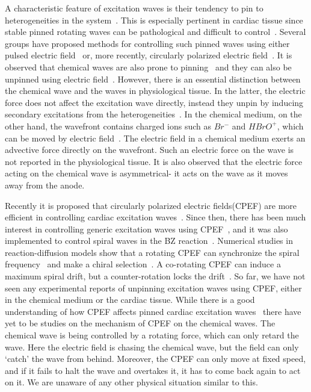 \documentclass[%
 reprint,
 amsmath,amssymb,
 aps,
prb,
]{revtex4-2}
\begin{document}
A characteristic feature of excitation waves is their
tendency to pin to heterogeneities in the
system~\cite{sutthiopad2015propagation, lim2006spiral,Zemlin2012, Shajahan:07}. This is especially
pertinent in cardiac tissue since stable pinned rotating waves can be
pathological and difficult to control~\cite{Gray2011, Bittihn2010}. Several
groups have proposed methods for controlling such pinned waves using either
pulsed electric field~\cite{Luther2011} or, more recently, circularly
polarized electric field~\cite{Feng2014, pan2016removal,feng2022removal}. It is
observed that chemical waves are also prone to pinning~\cite{???} and they can
also be unpinned using electric field~\cite{Amrutha,???}. However, there is an
essential distinction between the chemical wave and the waves in physiological
tissue. In the latter, the electric force does not affect the excitation wave
directly, instead they unpin by inducing secondary excitations from the
heterogeneities~\cite{pumir2007wave}. In the chemical medium, on the other hand,
the wavefront
contains charged ions such as $Br^-$ and $HBrO^+$, which can be moved by
electric field~\cite{Amrutha,jimenez2013electric,???}. The electric field in a
chemical medium exerts an advective force directly on the wavefront. Such an electric force on the wave is not reported in the physiological tissue. It is
also observed that the electric force acting on the chemical wave is
asymmetrical- it acts on the wave as it moves away from the anode.   

Recently it is proposed that circularly polarized electric fields(CPEF) are
more efficient in controlling cardiac excitation
waves~\cite{feng2022removal,punacha2020theory,Feng2014}. Since then, there has
been much interest in controlling generic excitation waves using
CPEF~\cite{pan2016removal}, and it was also implemented to control spiral waves
in the BZ reaction~\cite{chen2009synchronization,ji2013experimental}. Numerical studies in reaction-diffusion models show that a rotating CPEF can synchronize the spiral frequency~\cite{chen2009synchronization} and make a chiral selection~\cite{li2013chiral}.
A co-rotating CPEF can induce a maximum spiral drift, but a counter-rotation
locks the drift~\cite{chen2006drift}. 
So far, we have not seen any experimental reports of unpinning excitation
waves using CPEF, either in the chemical
medium or the cardiac tissue.  While there is a good understanding of how CPEF
affects pinned cardiac excitation waves~\cite{punacha2020theory} there have yet
to be studies on the
mechanism of CPEF on the chemical waves. The chemical wave is being controlled
by a rotating force, which can only retard the wave. Here the electric field is
chasing the chemical wave, but the field can only `catch' the wave from behind.
Moreover, the CPEF can only move at fixed
speed, and if it fails to halt the wave and overtakes it, it has to come back
again to act on it. We are unaware of any other physical situation 
similar to this.
\end{document}
